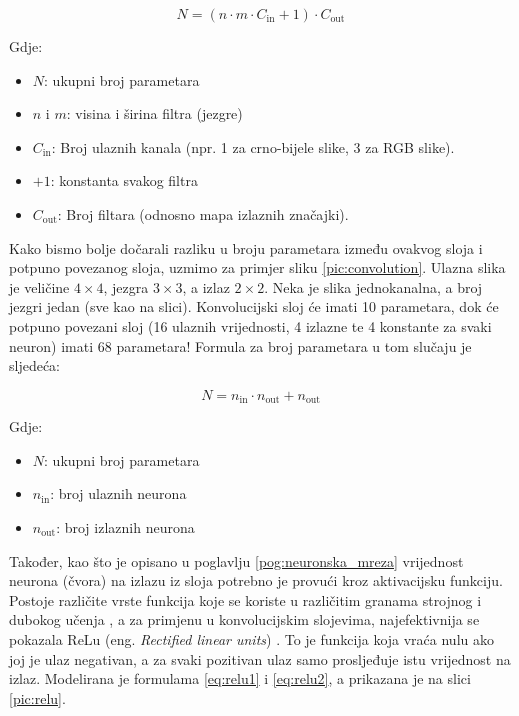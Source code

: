 \begin{equation}
    N = (n \cdot m \cdot C_{\text{in}} + 1) \cdot C_{\text{out}}
\end{equation}

Gdje:
\begin{itemize}
    \item \(N\): ukupni broj parametara
    \item \(n\) i \(m\): visina i širina filtra (jezgre)
    \item \(C_{\text{in}}\): Broj ulaznih kanala (npr. 1 za crno-bijele slike, 3 za RGB slike).
    \item \(+1\): konstanta svakog filtra
    \item \(C_{\text{out}}\): Broj filtara (odnosno mapa izlaznih značajki).
\end{itemize}

Kako bismo bolje dočarali razliku u broju parametara između ovakvog sloja i potpuno povezanog sloja,
uzmimo za primjer sliku \ref{pic:convolution}. Ulazna slika je veličine \(4 \times 4\),
jezgra \(3 \times 3\), a izlaz 
\(2 \times 2\). Neka je slika jednokanalna, a broj jezgri jedan (sve kao na slici). Konvolucijski sloj
će imati 10 parametara, dok će potpuno povezani sloj (16 ulaznih vrijednosti, 4 izlazne te
4 konstante za svaki neuron) imati 68 parametara! Formula za broj parametara u tom slučaju
je sljedeća:

\begin{equation}
    N = n_{\text{in}} \cdot n_{\text{out}} + n_{\text{out}}
\end{equation}

Gdje:
\begin{itemize}
    \item \(N\): ukupni broj parametara
    \item \(n_{\text{in}}\): broj ulaznih neurona
    \item \(n_{\text{out}}\): broj izlaznih neurona
\end{itemize}

Također, kao što je opisano u poglavlju \ref{pog:neuronska_mreza} vrijednost neurona (čvora) na
izlazu iz sloja potrebno je provući kroz aktivacijsku funkciju. Postoje različite vrste funkcija
koje se koriste u različitim granama strojnog i dubokog učenja \cite{activation_fcn}, a za
primjenu u konvolucijskim slojevima, najefektivnija se pokazala ReLu (eng. \textit{Rectified linear units})
\cite{relu}. To je funkcija koja vraća nulu ako joj je ulaz negativan, a za svaki pozitivan
ulaz samo prosljeđuje istu vrijednost na izlaz. Modelirana je formulama \ref{eq:relu1} i 
\ref{eq:relu2}, a prikazana je na slici \ref{pic:relu}. 

